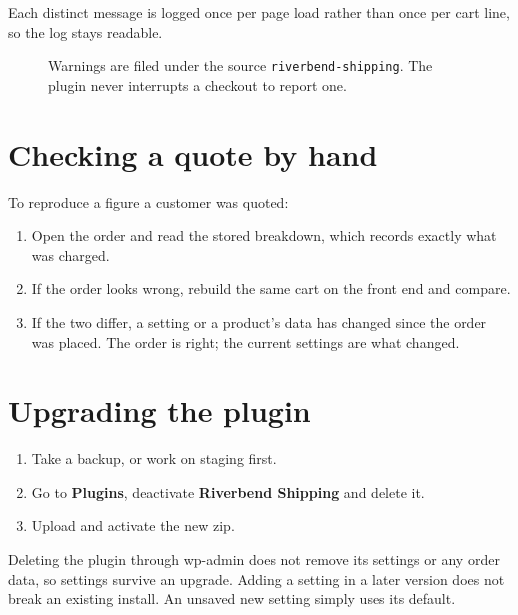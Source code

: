 \documentclass[11pt,a4paper,oneside]{report}
\newcommand{\opt}[1]{\texttt{\small #1}}
\newcommand{\menu}[1]{\textsf{\textbf{#1}}}
\begin{document}
Each distinct message is logged once per page load rather than once per cart line, so
the log stays readable.

\begin{figure}[H]
\centering
{}
\caption{Warnings are filed under the source \opt{riverbend-shipping}. The
plugin never interrupts a checkout to report one.}
\label{fig:admin-log}
\end{figure}

\section{Checking a quote by hand}

To reproduce a figure a customer was quoted:

\begin{enumerate}
  \item Open the order and read the stored breakdown, which records exactly what was
        charged.
  \item If the order looks wrong, rebuild the same cart on the front end and compare.
  \item If the two differ, a setting or a product's data has changed since the order
        was placed. The order is right; the current settings are what changed.
\end{enumerate}

\section{Upgrading the plugin}

\begin{enumerate}
  \item Take a backup, or work on staging first.
  \item Go to \menu{Plugins}, deactivate \menu{Riverbend Shipping} and delete it.
  \item Upload and activate the new zip.
\end{enumerate}

Deleting the plugin through wp-admin does not remove its settings or any order data,
so settings survive an upgrade. Adding a setting in a later version does not break an
existing install. An unsaved new setting simply uses its default.
\end{document}
